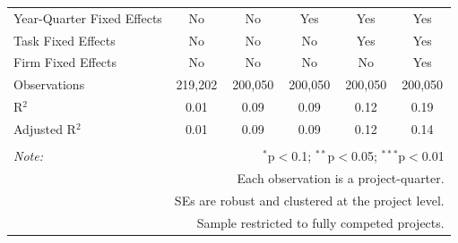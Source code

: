 \documentclass[
]{article}
\begin{document}
\begin{table}[H]
\begin{tabular}{@{\extracolsep{-2pt}}lccccc}
Year-Quarter Fixed Effects & No & No & Yes & Yes & Yes \\ 
Task Fixed Effects & No & No & No & Yes & Yes \\ 
Firm Fixed Effects & No & No & No & No & Yes \\ 
Observations & 219,202 & 200,050 & 200,050 & 200,050 & 200,050 \\ 
R$^{2}$ & 0.01 & 0.09 & 0.09 & 0.12 & 0.19 \\ 
Adjusted R$^{2}$ & 0.01 & 0.09 & 0.09 & 0.12 & 0.14 \\ 
\hline 
\hline \\[-1.8ex] 
\textit{Note:}  & \multicolumn{5}{r}{$^{*}$p$<$0.1; $^{**}$p$<$0.05; $^{***}$p$<$0.01} \\ 
 & \multicolumn{5}{r}{Each observation is a project-quarter.} \\ 
 & \multicolumn{5}{r}{SEs are robust and clustered at the project level.} \\ 
 & \multicolumn{5}{r}{Sample restricted to fully competed projects.} \\ 
\end{tabular} 
\end{table}
\end{document}

